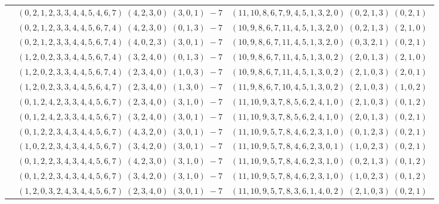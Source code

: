 \documentclass[11pt]{article}
\begin{document}
\begin{longtable}[l]{|c|c|c|}
 \cline{2-3} 
 & $(0 ,2 ,1 ,2 ,3 ,3 ,4 ,4 ,5 ,4 ,6 ,7) \;(4 ,2 ,3 ,0) \;(3 ,0 ,1) \;-7$ & $(11 ,10 ,8 ,6 ,7 ,9 ,4 ,5 ,1 ,3 ,2 ,0) \;(0 ,2 ,1 ,3) \;(0 ,2 ,1) \;$\\ 
 \cline{2-3} 
 & $(0 ,2 ,1 ,2 ,3 ,3 ,4 ,4 ,5 ,6 ,7 ,4) \;(4 ,2 ,3 ,0) \;(0 ,1 ,3) \;-7$ & $(10 ,9 ,8 ,6 ,7 ,11 ,4 ,5 ,1 ,3 ,2 ,0) \;(0 ,2 ,1 ,3) \;(2 ,1 ,0) \;$\\ 
 \cline{2-3} 
 & $(0 ,2 ,1 ,2 ,3 ,3 ,4 ,4 ,5 ,6 ,7 ,4) \;(4 ,0 ,2 ,3) \;(3 ,0 ,1) \;-7$ & $(10 ,9 ,8 ,6 ,7 ,11 ,4 ,5 ,1 ,3 ,2 ,0) \;(0 ,3 ,2 ,1) \;(0 ,2 ,1) \;$\\ 
 \cline{2-3} 
 & $(1 ,2 ,0 ,2 ,3 ,3 ,4 ,4 ,5 ,6 ,7 ,4) \;(3 ,2 ,4 ,0) \;(0 ,1 ,3) \;-7$ & $(10 ,9 ,8 ,6 ,7 ,11 ,4 ,5 ,1 ,3 ,0 ,2) \;(2 ,0 ,1 ,3) \;(2 ,1 ,0) \;$\\ 
 \cline{2-3} 
 & $(1 ,2 ,0 ,2 ,3 ,3 ,4 ,4 ,5 ,6 ,7 ,4) \;(2 ,3 ,4 ,0) \;(1 ,0 ,3) \;-7$ & $(10 ,9 ,8 ,6 ,7 ,11 ,4 ,5 ,1 ,3 ,0 ,2) \;(2 ,1 ,0 ,3) \;(2 ,0 ,1) \;$\\ 
 \cline{2-3} 
 & $(1 ,2 ,0 ,2 ,3 ,3 ,4 ,4 ,5 ,6 ,4 ,7) \;(2 ,3 ,4 ,0) \;(1 ,3 ,0) \;-7$ & $(11 ,9 ,8 ,6 ,7 ,10 ,4 ,5 ,1 ,3 ,0 ,2) \;(2 ,1 ,0 ,3) \;(1 ,0 ,2) \;$\\ 
 \cline{2-3} 
 & $(0 ,1 ,2 ,4 ,2 ,3 ,3 ,4 ,4 ,5 ,6 ,7) \;(2 ,3 ,4 ,0) \;(3 ,1 ,0) \;-7$ & $(11 ,10 ,9 ,3 ,7 ,8 ,5 ,6 ,2 ,4 ,1 ,0) \;(2 ,1 ,0 ,3) \;(0 ,1 ,2) \;$\\ 
 \cline{2-3} 
 & $(0 ,1 ,2 ,4 ,2 ,3 ,3 ,4 ,4 ,5 ,6 ,7) \;(3 ,2 ,4 ,0) \;(3 ,0 ,1) \;-7$ & $(11 ,10 ,9 ,3 ,7 ,8 ,5 ,6 ,2 ,4 ,1 ,0) \;(2 ,0 ,1 ,3) \;(0 ,2 ,1) \;$\\ 
 \cline{2-3} 
 & $(0 ,1 ,2 ,2 ,3 ,4 ,3 ,4 ,4 ,5 ,6 ,7) \;(4 ,3 ,2 ,0) \;(3 ,0 ,1) \;-7$ & $(11 ,10 ,9 ,5 ,7 ,8 ,4 ,6 ,2 ,3 ,1 ,0) \;(0 ,1 ,2 ,3) \;(0 ,2 ,1) \;$\\ 
 \cline{2-3} 
 & $(1 ,0 ,2 ,2 ,3 ,4 ,3 ,4 ,4 ,5 ,6 ,7) \;(3 ,4 ,2 ,0) \;(3 ,0 ,1) \;-7$ & $(11 ,10 ,9 ,5 ,7 ,8 ,4 ,6 ,2 ,3 ,0 ,1) \;(1 ,0 ,2 ,3) \;(0 ,2 ,1) \;$\\ 
 \cline{2-3} 
 & $(0 ,1 ,2 ,2 ,3 ,4 ,3 ,4 ,4 ,5 ,6 ,7) \;(4 ,2 ,3 ,0) \;(3 ,1 ,0) \;-7$ & $(11 ,10 ,9 ,5 ,7 ,8 ,4 ,6 ,2 ,3 ,1 ,0) \;(0 ,2 ,1 ,3) \;(0 ,1 ,2) \;$\\ 
 \cline{2-3} 
 & $(0 ,1 ,2 ,2 ,3 ,4 ,3 ,4 ,4 ,5 ,6 ,7) \;(3 ,4 ,2 ,0) \;(3 ,1 ,0) \;-7$ & $(11 ,10 ,9 ,5 ,7 ,8 ,4 ,6 ,2 ,3 ,1 ,0) \;(1 ,0 ,2 ,3) \;(0 ,1 ,2) \;$\\ 
 \cline{2-3} 
 & $(1 ,2 ,0 ,3 ,2 ,4 ,3 ,4 ,4 ,5 ,6 ,7) \;(2 ,3 ,4 ,0) \;(3 ,0 ,1) \;-7$ & $(11 ,10 ,9 ,5 ,7 ,8 ,3 ,6 ,1 ,4 ,0 ,2) \;(2 ,1 ,0 ,3) \;(0 ,2 ,1) \;$\\ 

\end{longtable}
\end{document}
